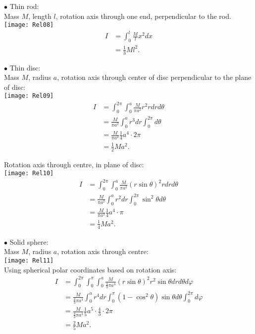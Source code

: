 \documentclass[a4paper]{article}
\begin{document}
$\bullet$ Thin rod:\\
Mass $M$, length $l$, rotation axis through one end, perpendicular to the rod.\\
\texttt{[image: Rel08]}\\
\begin{equation*}
\begin{aligned}
I &= \int_0^l \frac{M}{l} x^2 dx\\
&= \frac{1}{3}Ml^2.
\end{aligned}
\end{equation*}

$\bullet$ Thin disc:\\
Mass $M$, radius $a$, rotation axis through center of disc perpendicular to the plane of disc:\\
\texttt{[image: Rel09]}\\
\begin{equation*}
\begin{aligned}
I&=\int_0^{2\pi} \int_0^a \frac{M}{\pi a^2}r^2 rdrd\theta\\
&= \frac{M}{\pi a^2}\int_0^a r^3 dr \int_0^{2\pi} d\theta\\
&= \frac{M}{\pi a^2}\frac{1}{4}a^4\cdot 2\pi\\
&= \frac{1}{2}Ma^2.
\end{aligned}
\end{equation*}

Rotation axis through centre, in plane of disc:\\
\texttt{[image: Rel10]}\\
\begin{equation*}
\begin{aligned}
I&=\int_0^{2\pi} \int_0^a \frac{M}{\pi a^2}\left(r\sin \theta\right)^2 rdrd\theta\\
&= \frac{M}{\pi a^2} \int_0^a r^2 dr \int_0^{2\pi} \sin^2 \theta d\theta\\
&= \frac{M}{\pi a^2}\frac{1}{4}a^4\cdot \pi\\
&=\frac{1}{4}Ma^2.
\end{aligned}
\end{equation*}

$\bullet$ Solid sphere:\\
Mass $M$, radius $a$, rotation axis through centre:\\
\texttt{[image: Rel11]}\\
Using spherical polar coordinates based on rotation axis:\\
\begin{equation*}
\begin{aligned}
I&= \int_0^{2\pi} \int_0^\pi \int_0^a \frac{M}{\frac{4}{3}\pi a^3}\left(r\sin\theta\right)^2 r^2 \sin\theta dr d\theta d\varphi\\
&=\frac{M}{\frac{4}{3}\pi a^3}\int_0^a r^4 dr \int_0^\pi \left(1-\cos^2\theta\right)\sin\theta d\theta \int_0^{2\pi} d\varphi\\
&=\frac{M}{\frac{4}{3}\pi a^3}\frac{1}{5}a^5\cdot \frac{4}{3}\cdot 2\pi\\
&=\frac{2}{5}Ma^2.
\end{aligned}
\end{equation*}
\end{document}
